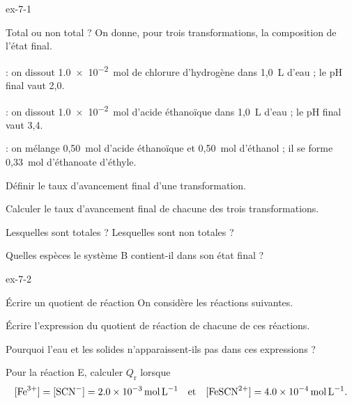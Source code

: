\begin{blocLivre}{ex-7-1}
\begin{exercice}[1]{Total ou non total ?}
On donne, pour trois transformations, la composition de l'état final.
\begin{questions}[label=\otLabel{\Alph*.},leftmargin=1.9em,itemsep=0pt,parsep=0.15em]
\item \mbox{} : on dissout \qty{1,0e-2}{mol} de chlorure d'hydrogène dans 1,0~L d'eau ;
le pH final vaut 2,0.
\item \mbox{} : on dissout \qty{1,0e-2}{mol} d'acide éthanoïque dans 1,0~L
d'eau ; le pH final vaut 3,4.
\item \mbox{} : on mélange 0,50~mol d'acide éthanoïque et 0,50~mol
d'éthanol ; il se forme 0,33~mol d'éthanoate d'éthyle.
\end{questions}
\begin{questions}
\item Définir le taux d'avancement final d'une transformation.
\item Calculer le taux d'avancement final de chacune des trois transformations.
\item Lesquelles sont totales ? Lesquelles sont non totales ?
\item Quelles espèces le système B contient-il dans son état final ?
\end{questions}
\end{exercice}
\end{blocLivre}
\begin{blocLivre}{ex-7-2}
\begin{exercice}[1]{Écrire un quotient de réaction}
On considère les réactions suivantes.
\begin{questions}[label=\otLabel{\Alph*.},leftmargin=1.9em,itemsep=0pt,parsep=0.15em]
\item {}
\item {}
\item {}
\item {}
\item {}
\end{questions}
\begin{questions}
\item Écrire l'expression du quotient de réaction de chacune de ces réactions.
\item Pourquoi l'eau et les solides n'apparaissent-ils pas dans ces expressions ?
\item Pour la réaction E, calculer $Q_\mathrm{r}$ lorsque
\[[\ce{Fe^3+}]=[\ce{SCN-}]=\qty{2,0e-3}{mol.L^{-1}}\quad\text{et}\quad[\ce{FeSCN^2+}]=\qty{4,0e-4}{mol.L^{-1}}.\]
\end{questions}
\end{exercice}
\end{blocLivre}
